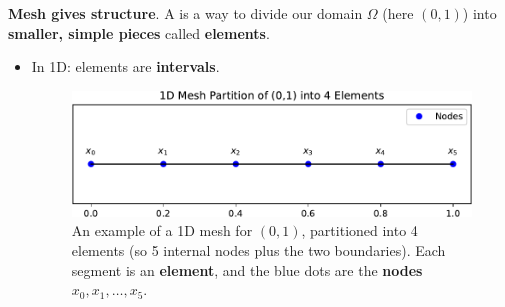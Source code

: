 \highspace
\textbf{Mesh gives structure}.\label{def: Mesh} A  is a way to divide our domain $\Omega$ (here $\left(0,1\right)$) into \textbf{smaller, simple pieces} called \textbf{elements}.
\begin{itemize}
    \item In 1D: elements are \textbf{intervals}.
    \begin{figure}[!htp]
        \centering
        \includegraphics[width=\textwidth]{img/poisson-1d/mesh-1d.pdf}
        \caption{An example of a 1D mesh for $(0,1)$, partitioned into 4 elements (so 5 internal nodes plus the two boundaries). Each segment is an \textbf{element}, and the blue dots are the \textbf{nodes} $x_{0}, x_{1}, \dots, x_{5}$.}
    \end{figure}
    
    \newpage
    

\end{itemize}
